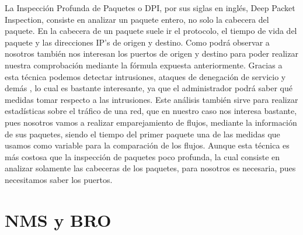 La Inspección Profunda de Paquetes o DPI, por sus siglas en inglés, Deep 
Packet Inspection, consiste en analizar un paquete entero, no solo la 
cabecera del paquete. En la cabecera de un paquete suele ir el protocolo, 
el tiempo de vida del paquete y las direcciones IP's de origen y destino. Como 
podrá observar a nosotros también nos interesan los puertos de origen y destino para poder 
realizar nuestra comprobación mediante la fórmula expuesta anteriormente.
Gracias a esta técnica podemos detectar intrusiones, ataques de denegación de servicio 
y demás \cite{dpiaproximacion}, lo cual es bastante 
interesante, ya que el administrador podrá saber qué medidas tomar respecto a las 
intrusiones. Este análisis también sirve para realizar estadísticas 
sobre el tráfico de una red, que en nuestro caso nos interesa bastante, 
pues nosotros vamos a realizar emparejamiento de flujos, mediante la 
información de sus paquetes, siendo el tiempo del primer paquete una de las 
medidas que usamos como variable para la comparación de los flujos. Aunque esta 
técnica es más costosa que la inspección de paquetes poco profunda, la 
cual consiste en analizar solamente las cabeceras de los paquetes, para nosotros es necesaria, 
pues necesitamos saber los puertos.

\section{NMS y BRO}

